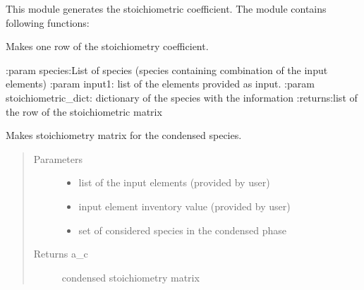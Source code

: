 \documentclass[letterpaper,10pt,english]{sphinxmanual}
\begin{document}
This module generates the stoichiometric coefficient. The module contains following functions:


\begin{fulllineitems}
Makes one row of the stoichiometry coefficient.

:param species:List of species (species containing combination of the input elements)
:param input1: list of the elements provided as input.
:param stoichiometric\_dict: dictionary of the species with the information
:returns:list of the row of the stoichiometric matrix

\end{fulllineitems}



\begin{fulllineitems}
Makes stoichiometry matrix for the condensed species.
\begin{quote}\begin{description}
\item[{Parameters}] \leavevmode\begin{itemize}
\item {} 
 \textendash{} list of the input elements (provided by user)

\item {} 
 \textendash{} input element inventory value (provided by user)

\item {} 
 \textendash{} set of considered species in the condensed phase

\end{itemize}

\item[{Returns a\_c}] \leavevmode
condensed stoichiometry matrix

\end{description}\end{quote}

\end{fulllineitems}
\end{document}
